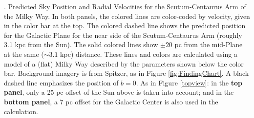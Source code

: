 \textbf{\label{fig:coloredlines}}. Predicted Sky Position and Radial Velocities for the Scutum-Centaurus Arm of the Milky Way.  In both panels, the colored lines are color-coded by velocity, given in the color bar at the top.  The colored dashed line shows the predicted position for the Galactic Plane for the near side of the Scutum-Centaurus Arm (roughly 3.1 kpc from the Sun).  The solid colored lines show $\pm 20$ pc from the mid-Plane at the same ($\sim3.1$ kpc) distance.   These lines and colors are calculated using a model of a (flat) Milky Way described by the parameters shown below the color bar. Background imagery is from Spitzer, as in Figure \ref{fig:FindingChart}. A black dashed line emphasizes the position of $b=0$.  As in Figure \ref{topview}: in the \textbf{top panel}, only a 25 pc offset of the Sun above is taken into account; and in the \textbf{bottom panel}, a 7 pc offset for the Galactic Center is also used in the calculation.